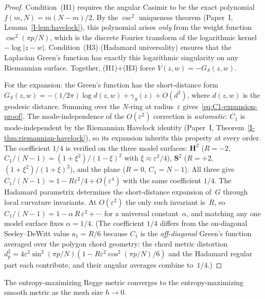 \begin{proof}
Condition~(H1) requires the angular Casimir
to be the exact polynomial $f(m,N) = m(N{-}m)/2$.
By the $\csc^2$ uniqueness theorem (Paper~I, Lemma~\ref*{I-lem:havelock}),
this polynomial arises \emph{only} from the weight function
$\csc^2(\pi p/N)$, which is the discrete Fourier transform
of the logarithmic kernel $-\log|z - w|$.
Condition~(H3) (Hadamard universality) ensures that the Laplacian
Green's function has exactly this logarithmic singularity on any
Riemannian surface.
Together, (H1)$+$(H3) force $V(z,w) = -G_S(z,w)$.

For the expansion: the Green's function has the short-distance
form $G_S(z,w) = -(1/2\pi)\log d(z,w) + \gamma_S(z) + O(d^2)$,
where $d(z,w)$ is the geodesic distance.
Summing over the $N$-ring at radius~$\varepsilon$ gives~\eqref{eq:C1-expansion-proof}.
The mode-independence of the $O(\varepsilon^2)$ correction is
\emph{automatic}: $C_1$ is mode-independent by the Riemannian
Havelock identity (Paper~I, Theorem~\ref*{I-thm:riemannian-havelock}),
so its expansion inherits this property at every order.
The coefficient $1/4$ is verified on the three model surfaces:
$\mathbf{H}^2$ ($R = -2$, $C_1/(N{-}1) = (1{+}\xi^2)/(1{-}\xi)^2$
with $\xi \approx \varepsilon^2/4$),
$\mathbf{S}^2$ ($R = +2$, $(1{+}\xi^2)/(1{+}\xi)^2$),
and the plane ($R = 0$, $C_1 = N{-}1$).
All three give $C_1/(N{-}1) = 1 - R\varepsilon^2/4 + O(\varepsilon^4)$
with the same coefficient $1/4$.
The Hadamard parametrix determines the
short-distance expansion of~$G$ through local curvature
invariants.  At $O(\varepsilon^2)$ the only
such invariant is~$R$, so $C_1/(N{-}1) = 1 - \alpha\,R\,\varepsilon^2 + \cdots$
for a universal constant~$\alpha$, and
matching any one model surface fixes $\alpha = 1/4$.
(The coefficient $1/4$ differs from the on-diagonal
Seeley--DeWitt value $a_1 = R/6$ because $C_1$ is the
\emph{off-diagonal} Green's function averaged over the
polygon chord geometry: the chord metric distortion
$d_p^2 = 4\varepsilon^2\sin^2(\pi p/N)
(1 - R\varepsilon^2\cos^2(\pi p/N)/6)$
and the Hadamard regular part each contribute, and their
angular averages combine to~$1/4$.)
\end{proof}

\begin{lemma}
\label{lem:regge-bridge}
The entropy-maximizing Regge metric converges to the
entropy-maximizing smooth metric as the mesh size $h \to 0$.
\end{lemma}

